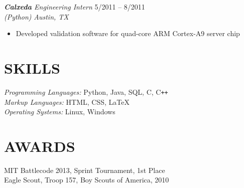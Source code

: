 \documentclass[margin]{res}
\begin{document}
\begin{resume}
                    {\sl {\bf Calxeda} Engineering Intern} 
                    \hfill 5/2011 -- 8/2011 \\
                    {\sl (Python)}
                    \hfill {\sl Austin, TX}
                    \begin{itemize} \itemsep -2pt %
                          \item Developed validation software for quad-core ARM 
                            Cortex-A9 server chip
                    \end{itemize}

\section{SKILLS}    {\sl Programming Languages:} Python, Java, SQL, C,
                      C\texttt{++} \\
                    {\sl Markup Languages:} HTML, CSS, \LaTeX \\
                    {\sl Operating Systems:} Linux, Windows
 
 
\section{AWARDS}    MIT Battlecode 2013, Sprint Tournament, 1st Place\\
                    Eagle Scout, Troop 157, Boy Scouts of America, 2010

\end{resume}
\end{document}
